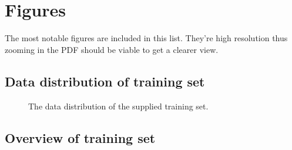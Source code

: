 \chapter*{Figures}

The most notable figures are included in this list. They're high resolution thus zooming in the PDF should be viable to get a clearer view.


\section*{Data distribution of training set}

\begin{figure}[H]
    \captionsetup{width=0.85\linewidth}
    \captionsetup{justification=centering}
    \caption{The data distribution of the supplied training set.}
\end{figure}


\section*{Overview of training set}

